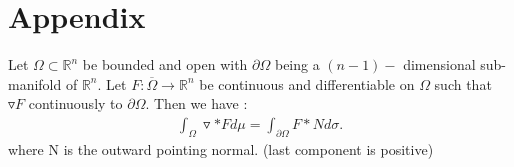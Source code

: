 \chapter{Appendix}
\begin{theorem}
  Let $\Omega \subset  \mathbb{R}^{n }  $ be bounded and open with $\partial \Omega $ being a 
  $(n-1)-$ dimensional sub-manifold of $\mathbb{R}^{n } $. Let $F : \overline{\Omega}  \to  \mathbb{R}^{n } $ be continuous and 
  differentiable on $\Omega $ such that $\triangledown F$ continuously to $\partial \Omega $. Then we have : 
  \begin{align*}
    \int_{\Omega } \triangledown * F d\mu = \int_{\partial \Omega } F * N d\sigma
  .\end{align*}
  where N is the outward pointing normal. (last component is positive)
\end{theorem}
